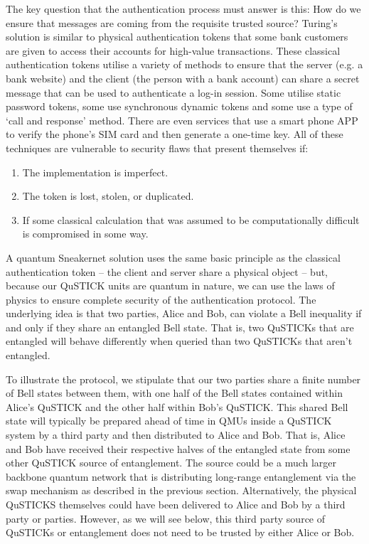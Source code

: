 \documentclass[twocolumn, aps, rmp, amsmath, amssymb, nofootinbib, superscriptaddress, longbibliography, floatfix, table-of-contents, eqsecnum]{revtex4-2}
\begin{document}
The key question that the authentication process must answer is this: How do we ensure that messages are coming from the requisite trusted source? Turing's solution is similar to physical authentication tokens that some bank customers are given to access their accounts for high-value transactions. These classical authentication tokens utilise a variety of methods to ensure that the server (e.g. a bank website) and the client (the person with a bank account) can share a secret message that can be used to authenticate a log-in session. Some utilise static password tokens, some use synchronous dynamic tokens and some use a type of `call and response' method. There are even services that use a smart phone APP to verify the phone's SIM card and then generate a one-time key. All of these techniques are vulnerable to security flaws that present themselves if:
\begin{enumerate}
\item The implementation is imperfect.
\item The token is lost, stolen, or duplicated.
\item If some classical calculation that was assumed to be computationally difficult is compromised in some way. 
\end{enumerate}

A quantum Sneakernet solution uses the same basic principle as the classical authentication token -- the client and server share a physical object -- but, because our QuSTICK units are quantum in nature, we can use the laws of physics to ensure complete security of the authentication protocol. The underlying idea is that two parties, Alice and Bob, can violate a Bell inequality if and only if they share an entangled Bell state. That is, two QuSTICKs that are entangled will behave differently when queried than two QuSTICKs that aren't entangled.

To illustrate the protocol, we stipulate that our two parties share a finite number of Bell states between them, with one half of the Bell states contained within Alice's QuSTICK and the other half within Bob's QuSTICK. This shared Bell state will typically be prepared ahead of time in QMUs inside a QuSTICK system by a third party and then distributed to Alice and Bob. That is, Alice and Bob have received their respective halves of the entangled state from some other QuSTICK source of entanglement. The source could be a much larger backbone quantum network that is distributing long-range entanglement via the swap mechanism as described in the previous section. Alternatively, the physical QuSTICKS themselves could have been delivered to Alice and Bob by a third party or parties. However, as we will see below, this third party source of QuSTICKs or entanglement does not need to be trusted by either Alice or Bob.
\end{document}
